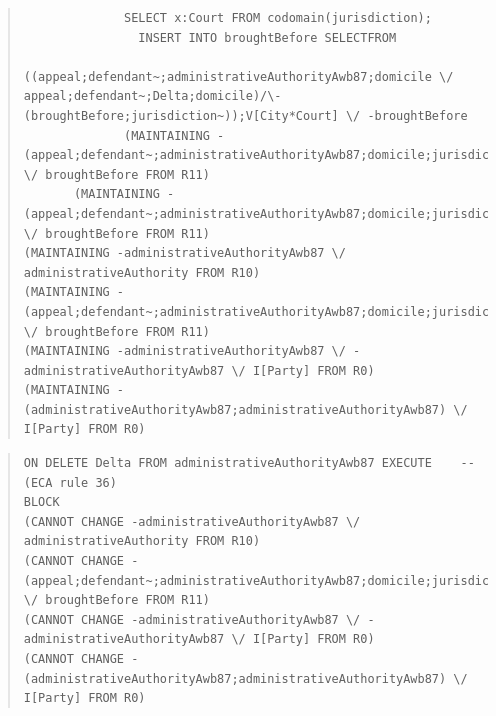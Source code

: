 \documentclass[10pt,a4paper]{report}              %
\theoremstyle{plain}\theorembodyfont{\rmfamily}\newtheorem{definition}{Definition}[section]
\theoremstyle{plain}\theorembodyfont{\rmfamily}\newtheorem{designrule}[definition]{Requirement}
\begin{document}
\begin{quote}
\begin{verbatim}
              SELECT x:Court FROM codomain(jurisdiction);
                INSERT INTO broughtBefore SELECTFROM
                  ((appeal;defendant~;administrativeAuthorityAwb87;domicile \/ appeal;defendant~;Delta;domicile)/\-(broughtBefore;jurisdiction~));V[City*Court] \/ -broughtBefore
              (MAINTAINING -(appeal;defendant~;administrativeAuthorityAwb87;domicile;jurisdiction) \/ broughtBefore FROM R11)
       (MAINTAINING -(appeal;defendant~;administrativeAuthorityAwb87;domicile;jurisdiction) \/ broughtBefore FROM R11)
(MAINTAINING -administrativeAuthorityAwb87 \/ administrativeAuthority FROM R10)
(MAINTAINING -(appeal;defendant~;administrativeAuthorityAwb87;domicile;jurisdiction) \/ broughtBefore FROM R11)
(MAINTAINING -administrativeAuthorityAwb87 \/ -administrativeAuthorityAwb87 \/ I[Party] FROM R0)
(MAINTAINING -(administrativeAuthorityAwb87;administrativeAuthorityAwb87) \/ I[Party] FROM R0)
\end{verbatim}
\end{quote}
\begin{quote}
\begin{verbatim}
ON DELETE Delta FROM administrativeAuthorityAwb87 EXECUTE    -- (ECA rule 36)
BLOCK
(CANNOT CHANGE -administrativeAuthorityAwb87 \/ administrativeAuthority FROM R10)
(CANNOT CHANGE -(appeal;defendant~;administrativeAuthorityAwb87;domicile;jurisdiction) \/ broughtBefore FROM R11)
(CANNOT CHANGE -administrativeAuthorityAwb87 \/ -administrativeAuthorityAwb87 \/ I[Party] FROM R0)
(CANNOT CHANGE -(administrativeAuthorityAwb87;administrativeAuthorityAwb87) \/ I[Party] FROM R0)
\end{verbatim}
\end{quote}
\end{document}
